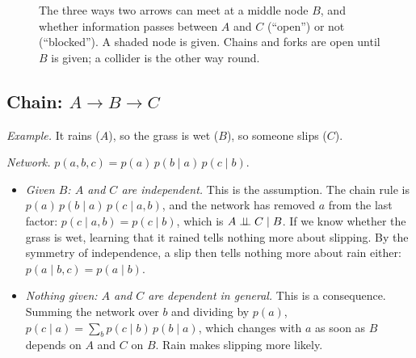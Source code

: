 \begin{figure}[ht]
\centering
{}
\caption{The three ways two arrows can meet at a middle node $B$, and
whether information passes between $A$ and $C$ (``open'') or not
(``blocked''). A shaded node is given. Chains and forks are open until $B$
is given; a collider is the other way round.}
\label{fig:connections}
\end{figure}

\subsection*{Chain: $A\rightarrow B\rightarrow C$}

\emph{Example.} It rains ($A$), so the grass is wet ($B$), so someone
slips ($C$).

\emph{Network.} $p(a,b,c)=p(a)\,p(b\mid a)\,p(c\mid b)$.
\begin{itemize}[nosep]
  \item \emph{Given $B$: $A$ and $C$ are independent.} This is the assumption. The chain
    rule is $p(a)\,p(b\mid a)\,p(c\mid a,b)$, and the network has removed
    $a$ from the last factor: $p(c\mid a,b)=p(c\mid b)$, which is
    $A\mathrel{\perp\!\!\!\perp} C\mid B$. If we know whether the grass is wet, learning that
    it rained tells nothing more about slipping. By the symmetry of
    independence, a slip then tells nothing more about rain either:
    $p(a\mid b,c)=p(a\mid b)$.
  \item \emph{Nothing given: $A$ and $C$ are dependent in general.} This is a consequence.
    Summing the network over $b$ and dividing by $p(a)$,
    $p(c\mid a)=\sum_bp(c\mid b)\,p(b\mid a)$, which changes with $a$ as
    soon as $B$ depends on $A$ and $C$ on $B$. Rain makes slipping more
    likely.
\end{itemize}

